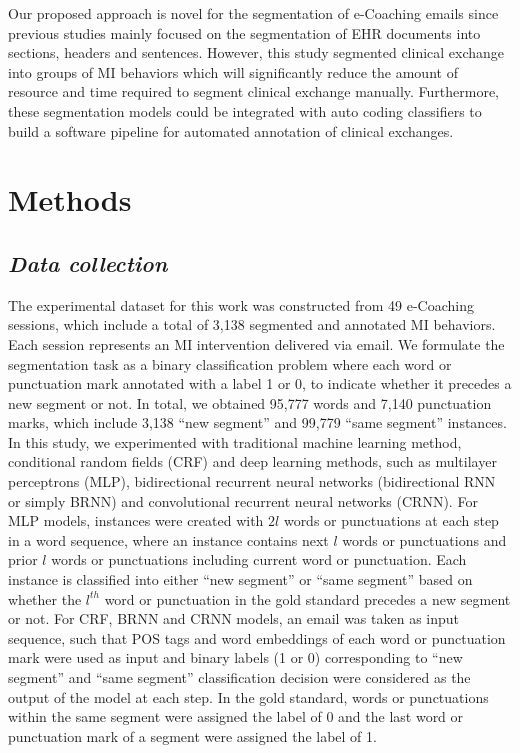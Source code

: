 \documentclass{amia}
\begin{document}
Our proposed approach is novel for the segmentation of e-Coaching emails since previous studies mainly focused on the segmentation of EHR documents into sections, headers and sentences. However, this study segmented clinical exchange into groups of MI behaviors which will significantly reduce the amount of resource and time required to segment clinical exchange manually. Furthermore, these segmentation models could be integrated with auto coding classifiers to build a software pipeline for automated annotation of clinical exchanges.
  
\section*{Methods}
\subsection*{\textit{Data collection}}

The experimental dataset for this work was constructed from 49 e-Coaching sessions, which include a total of 3,138 segmented and annotated MI behaviors. Each session represents an MI intervention delivered via email. We formulate the segmentation task as a binary classification problem where each word or punctuation mark annotated with a label 1 or 0, to indicate whether it precedes a new segment or not. In total, we obtained 95,777 words and 7,140 punctuation marks, which include 3,138 ``new segment'' and 99,779 ``same segment'' instances. In this study, we experimented with traditional machine learning method, conditional random fields (CRF)\cite{lafferty2001conditional} and deep learning methods, such as multilayer perceptrons (MLP),\cite{rumelhart1986learning} bidirectional recurrent neural networks (bidirectional RNN or simply BRNN)\cite{schuster1997bidirectional} and convolutional recurrent neural networks (CRNN).\cite{treviso2017sentence} For MLP models, instances were created with $2l$ words or punctuations at each step in a word sequence, where an instance contains next $l$ words or punctuations and prior $l$ words or punctuations including current word or punctuation. Each instance is classified into either ``new segment'' or ``same segment'' based on whether the $l^{th}$ word or punctuation in the gold standard precedes a new segment or not. For CRF, BRNN and CRNN models, an email was taken as input sequence, such that POS tags and word embeddings of each word or punctuation mark were used as input and binary labels (1 or 0) corresponding to ``new segment'' and ``same segment'' classification decision were considered as the output of the model at each step. In the gold standard, words or punctuations within the same segment were assigned the label of 0 and the last word or punctuation mark of a segment were assigned the label of 1.     
\end{document}
